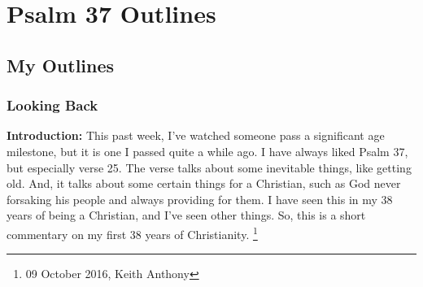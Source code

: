 \section{Psalm 37 Outlines}

\subsection{My Outlines}

\subsubsection{Looking Back}
\textbf{Introduction: }This past week, I've watched someone pass a significant age milestone, but it is one I passed quite a while ago.  I have always liked Psalm 37, but especially verse 25. The verse talks about some inevitable things, like getting old.  And, it talks about some certain things for a Christian, such as God never forsaking his people and always providing for them. I have seen this in my 38 years of being a Christian, and I've seen other things. So, this is a short commentary on my first 38 years of Christianity. \footnote{09 October 2016, Keith Anthony}
